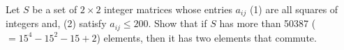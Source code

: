 Let $S$ be a set of $2 \times 2$ integer matrices whose
entries $a_{ij}$ (1) are all squares of integers and, (2) satisfy $a_{ij}
\leq 200$. Show that if $S$ has more than 50387 ($= 15^4 - 15^2 - 15 +
2$) elements, then it has two elements that commute.
